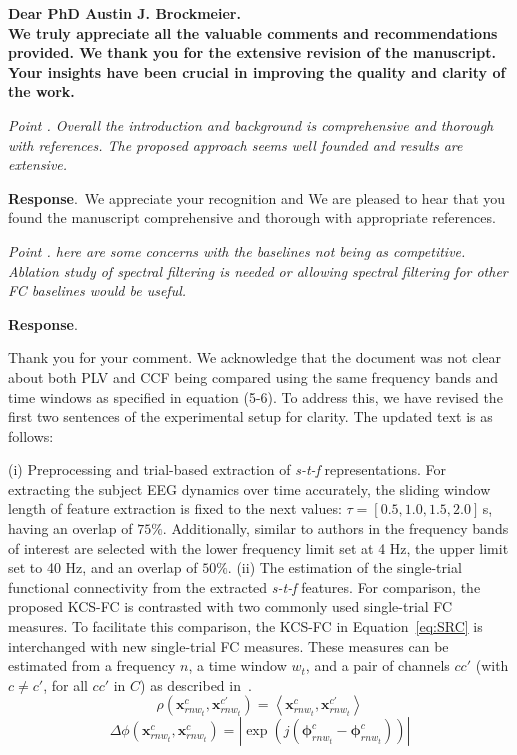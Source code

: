 \documentclass[runningheads]{llncs}
\newcommand{\ve}[1]{\bm {#1}}
\newenvironment{reviewer}{\setcounter{pointcounter}{1}}{}
\newcommand{\changes}[1]{\textcolor[rgb]{1.00,0.00,0.00}{#1}}
\newcommand{\point}[1]{\medskip \noindent
  \textsl{{\fontseries{b}\selectfont Point \thepointcounter}.
\stepcounter{pointcounter} #1}}
\newcommand{\reply}{\medskip \noindent \textbf{Response}.\ }
\begin{document}
\begin{reviewer}
  \textbf{Dear PhD Austin J. Brockmeier.}\\

  \textbf{We truly appreciate all the valuable comments and
    recommendations provided. We thank you for the extensive revision
    of the manuscript. Your insights have been crucial in improving the
  quality and clarity of the work.}

  \point{Overall the introduction and background is comprehensive and
    thorough with references. The proposed approach seems well founded
  and results are extensive.}

  \reply{We appreciate your recognition and We are pleased to hear
    that you found the manuscript comprehensive and thorough with
  appropriate references.}

  \point{here are some concerns with the baselines not being as
    competitive. Ablation study of spectral filtering is needed or
  allowing spectral filtering for other FC baselines would be useful.}

  \reply{Thank you for your comment. We acknowledge that the document
    was not clear about both PLV and CCF being compared using the
    same frequency bands and time windows as specified in equation
    (5-6). To address this, we have revised the first two sentences
    of the experimental setup for clarity. The updated text is as follows:

    \changes{
      ({i}) Preprocessing and trial-based extraction of
      \textit{s-t-f} representations. For extracting the subject EEG
      dynamics over time accurately, the sliding window length of
      feature extraction is fixed to the next values:
      $\tau=[0.5,1.0,1.5,2.0]$\,{s}, having an overlap of $75\%$.
      Additionally, similar to authors in \cite{ang2008filter} the
      frequency bands of interest are selected with the lower
      frequency limit set at 4 Hz, the upper limit set to 40 Hz, and
      an overlap of $50\%$. \cite{ang2008filter}
    }
    \changes{
      ({ii}) The estimation of the single-trial functional
      connectivity from the extracted \textit{s-t-f} features. For
      comparison, the proposed KCS-FC is contrasted with two commonly
      used single-trial FC measures. To facilitate this comparison,
      the KCS-FC in Equation~\eqref{eq:SRC} is interchanged with new
      single-trial FC measures. These measures can be estimated from
      a frequency $n$, a time window $w_t$, and a pair of channels
      ${cc'}$ (with $c \neq c'$, for all $cc'$ in $C$) as described
      in~\cite{rodrigue2019}.
      \begin{equation}
        \rho(\ve{x}^{c}_{rnw_t},\ve{x}^{c'}_{rnw_t})
        ={\left<\ve{x}^{c}_{rnw_t},\ve{x}^{c'}_{rnw_t}\right>}\label{Eq:Pearson}
      \end{equation}
      \begin{equation}
        {\Delta\phi(\ve{x}^{c}_{rnw_t},\ve{x}^{c}_{rnw_t})}  {=
        {|\exp(j(\ve{\phi}_{rnw_t}^{c}-\ve{\phi}_{rnw_t}^{c}))|}} \label{Eq:PLV}
      \end{equation}
    }
  }


\end{reviewer}
\end{document}
